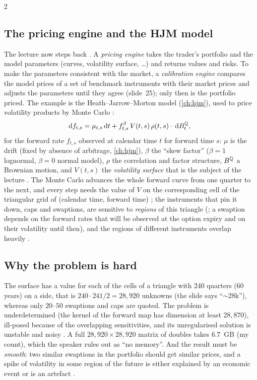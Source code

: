 \begin{paracol}{2}
\subsection{The pricing engine and the HJM model}\label{ch20:sec-hjmvol}
The lecture now steps back . A \emph{pricing engine} takes the trader's portfolio and the model parameters (curves, volatility surface, \dots) and returns values and risks. To make
the parameters consistent with the market, a \emph{calibration engine} compares the model prices of a set of benchmark instruments with their market prices and adjusts the parameters until they agree
(slide~25); only then is the portfolio priced. The example is the Heath--Jarrow--Morton model (\cref{ch:hjm}), used to price volatility products by Monte Carlo :
\begin{equation}\label{ch20:eq-hjm}
  \,\mathrm{d} f_{t,s}=\mu_{t,s}\,\mathrm{d} t+f_{t,s}^{\beta}\,V(t,s)\,\rho(t,s)\cdot\,\mathrm{d} B^{\mathbb{Q}}_t ,
\end{equation}
for the forward rate $f_{t,s}$ observed at calendar time $t$ for forward time $s$: $\mu$ is the drift (fixed by absence of arbitrage, \cref{ch:hjm}), $\beta$ the ``skew factor'' ($\beta=1$ lognormal, $\beta=0$ normal model), $\rho$ the correlation and factor structure, $B^{\mathbb{Q}}$ a
Brownian motion, and $V(t,s)$ the \emph{volatility surface} that is the subject of the lecture . The Monte Carlo advances the whole forward curve from one quarter to the next, and every step needs the value of $V$ on
the corresponding cell of the triangular grid of (calendar time, forward time) ; the instruments that pin it down, caps and swaptions, are sensitive to \emph{regions} of this triangle (; a swaption
depends on the forward rates that will be observed at the option expiry and on their volatility until then), and the regions of different instruments overlap heavily .

\subsection{Why the problem is hard}\label{ch20:sec-volhard}
The surface has a value for each of the cells of a triangle with 240 quarters (60 years) on a side, that is $240\cdot241/2=28{,}920$ unknowns  (the slide says ``$\sim$28k''), whereas only $20$--$50$ swaptions and caps are quoted. The problem is underdetermined
(the kernel of the forward map has dimension at least $28{,}870$), ill-posed because of the overlapping sensitivities, and its unregularised solution is unstable and noisy . A full $28{,}920\times28{,}920$ matrix of doubles takes $6.7$~GB (my count),
which the speaker rules out as ``no memory''. And the result must be \emph{smooth}: two similar swaptions in the portfolio should get similar prices, and a spike of volatility in some region of the future is either explained by an economic event or is an artefact
.


\end{paracol}
